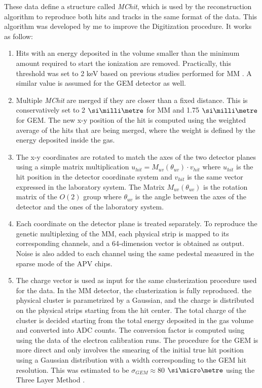 These data define a structure called \textit{MChit}, which is used by the reconstruction algorithm to reproduce both hits and tracks in the same format of the data. This algorithm was developed by me to improve the Digitization procedure. It works as follow:
\begin{enumerate}

\item Hits with an energy deposited in the volume smaller than the minimum amount required to start the ionization are removed. Practically, this threshold was set to 2 keV based on previous studies performed for MM \cite{IGUAZ20121079}. A similar value is assumed for the GEM detector as well.
\item Multiple \textit{MChit} are merged if they are closer than a fixed distance. This is conservatively set to 2 $\mmi$  for MM and 1.75 $\mmi$  for GEM. The new x-y position of the hit is computed using the weighted average of the hits that are being merged, where the weight is defined by the energy deposited inside the gas.
\item The x-y coordinates are rotated to match the axes of the two detector planes using a simple matrix multiplication $u_{hit} = M_{uv}(\theta_{uv}) \cdot v_{hit}$ where $u_{hit}$ is the hit position in the detector coordinate system and $v_{hit}$ is the same vector expressed in the laboratory system. The Matrix $M_{uv}(\theta_{uv})$ is the rotation matrix of the $O(2)$ group where $\theta_{uv}$ is the angle between the axes of the detector and the ones of the laboratory system.
\item Each coordinate on the detector plane is treated separately. To reproduce the genetic multiplexing of the MM, each physical strip is mapped to its corresponding channels, and a 64-dimension vector is obtained as output. Noise is also added to each channel using the same pedestal measured in the sparse mode of the APV chips.
\item  The charge vector is used as input for the same clusterization procedure used for the data. In the MM detector, the clusterization is fully reproduced. the physical cluster is parametrized by a Gaussian, and the charge is distributed on the physical strips starting from the hit center. The total charge of the cluster is decided starting from the total energy deposited in the gas volume and converted into ADC counts. The conversion factor is computed using using the data of the electron calibration runs. The procedure for the GEM is more direct and only involves the smearing of the initial true hit position using a Gaussian distribution with a width corresponding to the GEM hit resolution. This was estimated to be $\sigma_{GEM} \approx 80$ $\mum$ using the Three Layer Method \cite{Bortfeldt:2014vvt}.

\end{enumerate}
